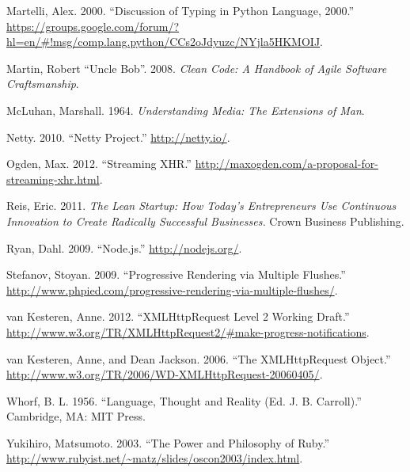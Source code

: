 \documentclass[12pt, ]{article}
\begin{document}
Martelli, Alex. 2000. ``Discussion of Typing in Python Language, 2000.''
\url{https://groups.google.com/forum/?hl=en/\#!msg/comp.lang.python/CCs2oJdyuzc/NYjla5HKMOIJ}.

Martin, Robert ``Uncle Bob''. 2008. \emph{Clean Code: A Handbook of
Agile Software Craftsmanship}.

McLuhan, Marshall. 1964. \emph{Understanding Media: The Extensions of
Man}.

Netty. 2010. ``Netty Project.'' \url{http://netty.io/}.

Ogden, Max. 2012. ``Streaming XHR.''
\url{http://maxogden.com/a-proposal-for-streaming-xhr.html}.

Reis, Eric. 2011. \emph{The Lean Startup: How Today's Entrepreneurs Use
Continuous Innovation to Create Radically Successful Businesses.} Crown
Business Publishing.

Ryan, Dahl. 2009. ``Node.js.'' \url{http://nodejs.org/}.

Stefanov, Stoyan. 2009. ``Progressive Rendering via Multiple Flushes.''
\url{http://www.phpied.com/progressive-rendering-via-multiple-flushes/}.

van Kesteren, Anne. 2012. ``XMLHttpRequest Level 2 Working Draft.''
\url{http://www.w3.org/TR/XMLHttpRequest2/\#make-progress-notifications}.

van Kesteren, Anne, and Dean Jackson. 2006. ``The XMLHttpRequest
Object.'' \url{http://www.w3.org/TR/2006/WD-XMLHttpRequest-20060405/}.

Whorf, B. L. 1956. ``Language, Thought and Reality (Ed. J. B.
Carroll).'' Cambridge, MA: MIT Press.

Yukihiro, Matsumoto. 2003. ``The Power and Philosophy of Ruby.''
\url{http://www.rubyist.net/~matz/slides/oscon2003/index.html}.
\end{document}
